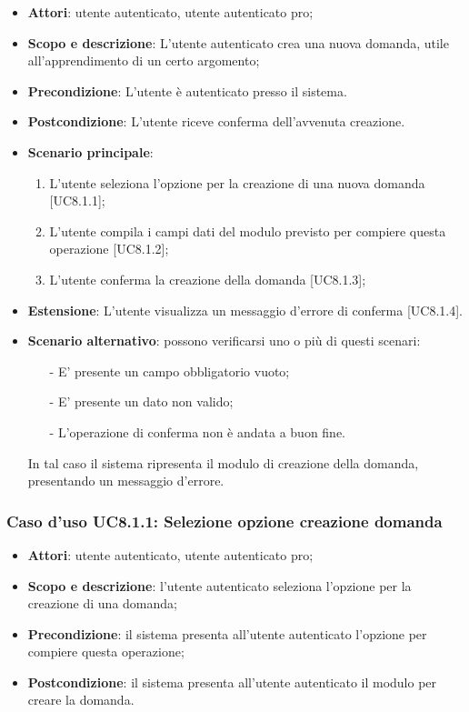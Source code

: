 	\begin{itemize}
		\item
			\textbf{Attori}: utente autenticato, utente autenticato pro;
		\item		
			\textbf{Scopo e descrizione}: L'utente autenticato crea una nuova domanda, utile all'apprendimento di un certo argomento;
		\item
			\textbf{Precondizione}: L'utente è autenticato presso il sistema. 
		\item
			\textbf{	Postcondizione}: L'utente riceve conferma dell'avvenuta creazione.		
		\item
			\textbf{Scenario principale}:
	       		\begin{enumerate}
					\item 	
					L'utente seleziona l'opzione per la creazione di una nuova domanda [UC8.1.1];
					\item
					L'utente compila i campi dati del modulo previsto per compiere questa operazione [UC8.1.2];
					\item
					L'utente conferma la creazione della domanda [UC8.1.3];
	 			\end{enumerate}
	 	\item
			\textbf{Estensione}: L'utente visualizza un messaggio d'errore di conferma [UC8.1.4].
	 	\item
	 		\textbf{Scenario alternativo}: possono verificarsi uno o più di questi scenari:
				\begin{itemize}
					\item[-] 	
						E' presente un campo obbligatorio vuoto;
					\item[-] 
    						E' presente un dato non valido;
					\item[-] 
						L'operazione di conferma non è andata a buon fine.
				\end{itemize}
			In tal caso il sistema ripresenta il modulo di creazione della domanda, presentando un messaggio d'errore.
	\end{itemize}
	\subsubsection{Caso d'uso UC8.1.1: Selezione opzione creazione domanda}
	\begin{itemize}
		\item
			\textbf{Attori}: utente autenticato, utente autenticato pro;
		\item
			\textbf{Scopo e descrizione}: l'utente autenticato seleziona l'opzione per la creazione di una domanda;
		\item		
			\textbf{Precondizione}: il sistema presenta all'utente autenticato l'opzione per compiere questa operazione;
		\item
			\textbf{Postcondizione}: il sistema presenta all'utente autenticato il modulo per creare la domanda.
	\end{itemize}	
